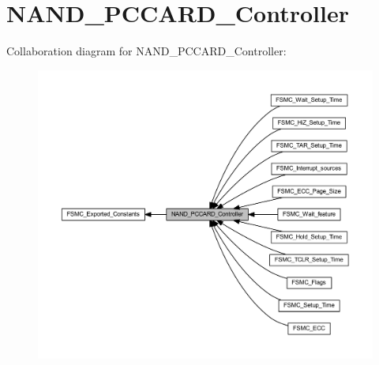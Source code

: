 \hypertarget{group___n_a_n_d___p_c_c_a_r_d___controller}{}\section{N\+A\+N\+D\+\_\+\+P\+C\+C\+A\+R\+D\+\_\+\+Controller}
\label{group___n_a_n_d___p_c_c_a_r_d___controller}
Collaboration diagram for N\+A\+N\+D\+\_\+\+P\+C\+C\+A\+R\+D\+\_\+\+Controller\+:
\nopagebreak
\begin{figure}[H]
\begin{center}
\leavevmode
\includegraphics[width=350pt]{group___n_a_n_d___p_c_c_a_r_d___controller}
\end{center}
\end{figure}
